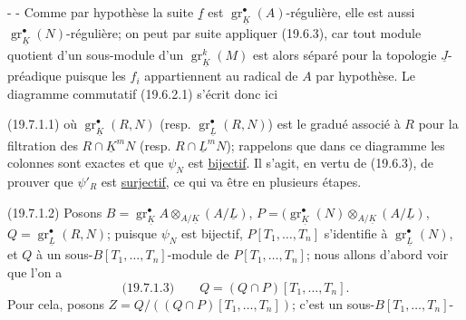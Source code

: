 -  -
Comme par hypothèse la suite $\underline f$ est $\operatorname{gr}_{\underline K}^\bullet(A)$-régulière, elle est aussi
$\operatorname{gr}_{\underline K}^\bullet(N)$-régulière; on peut par suite appliquer (19.6.3), car tout module
quotient d'un sous-module d'un 
$\operatorname{gr}_{\underline K}^k(M)$ est alors séparé pour
la topologie $\underline J$-préadique puisque les $f_i$ appartiennent au radical de $A$
par hypothèse. Le diagramme commutatif (19.6.2.1) s'écrit donc ici

(19.7.1.1)
où $\operatorname{gr}_{\underline K}^\bullet(R,N)$ 
(resp. $\operatorname{gr}_{\underline L}^\bullet(R,N)$) est le gradué associé à $R$
pour la filtration des $R\cap\underline K^mN$ (resp.  $R\cap\underline L^mN$);
rappelons que dans
ce diagramme les colonnes sont exactes et que $\psi_N$ est \uline{bijectif}. Il s'agit,
en vertu de (19.6.3), de prouver que $\psi'_R$ est \uline{surjectif}, ce qui
va être  en plusieurs étapes.

(19.7.1.2) Posons $B=\operatorname{gr}_{\underline K}^\bullet A\otimes_{A/\underline K}(A/\underline L)$,
$P=(\operatorname{gr}_{\underline K}^\bullet(N)\otimes_{A/\underline K}(A/\underline L)$,
$Q=\operatorname{gr}_{\underline L}^\bullet(R,N)$;
puisque $\psi_N$ est bijectif,  $P[T_1,\ldots,T_n]$ s'identifie à
$\operatorname{gr}_{\underline L}^\bullet(N)$, et
 $Q$ à un sous-$B[T_1,\ldots,T_n]$-module de $P[T_1,\ldots,T_n]$;
nous allons
d'abord voir que l'on a
\[
\text{(19.7.1.3)}\qquad Q=(Q\cap P)[T_1,\ldots,T_n].
\]
Pour cela, posons $Z=Q/((Q\cap P)[T_1,\ldots,T_n])$; c'est un sous-$B[T_1,\ldots,T_n]$-
